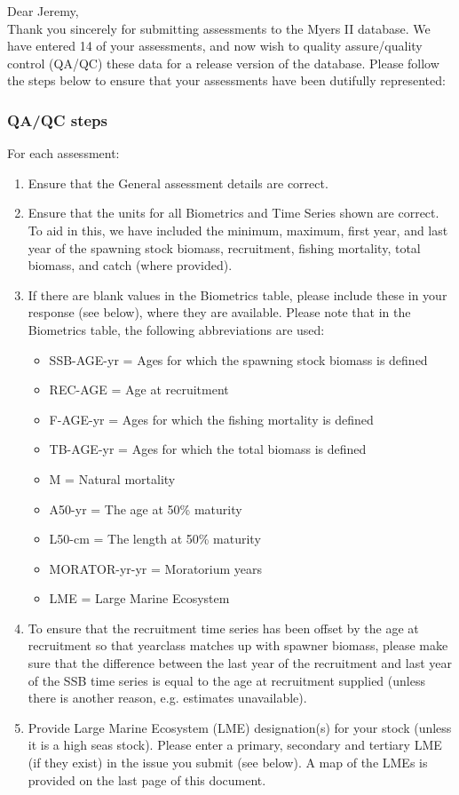 \documentclass [a4paper, 10pt] {article}
\begin{document}
\noindent Dear Jeremy,\\

\noindent Thank you sincerely for submitting assessments to the Myers II database. We have entered 14 of your assessments, and now wish to quality assure/quality control (QA/QC) these data for a release version of the database. Please follow the steps below to ensure that your assessments have been dutifully represented:
\subsubsection{QA/QC steps}
For each assessment:
\begin{enumerate}
\item Ensure that the General assessment details are correct.
\item Ensure that the units for all Biometrics and Time Series shown are correct. To aid in this, we have included the minimum, maximum, first year, and last year of the spawning stock biomass, recruitment, fishing mortality, total biomass, and  catch  (where provided). 
\item If there are blank values in the Biometrics table, please include these in your response (see below), where they are available.
Please note that in the Biometrics table, the following abbreviations are used:
\begin{itemize}
\item SSB-AGE-yr  = Ages for which the spawning stock biomass is defined
\item REC-AGE     = Age at recruitment
\item F-AGE-yr    = Ages for which the fishing mortality is defined 
\item TB-AGE-yr   = Ages for which the total biomass is defined
\item M      = Natural mortality
\item A50-yr      = The age at 50\% maturity
\item L50-cm      = The length at 50\% maturity
\item MORATOR-yr-yr = Moratorium years
\item LME = Large Marine Ecosystem\\
\end{itemize}
\item To ensure that the recruitment time series has been offset by the age at recruitment so that yearclass matches up with spawner biomass, please make sure that the difference between the last year of the recruitment and last year of the SSB time series is equal to the age at recruitment supplied (unless there is another reason, e.g. estimates unavailable). 
\item Provide Large Marine Ecosystem (LME) designation(s) for your stock (unless it is a high seas stock). Please enter a primary, secondary and tertiary LME (if they exist) in the issue you submit (see below). A map of the LMEs is provided on the last page of this document. 
\end{enumerate}
\vspace{-.25in}
\end{document}
